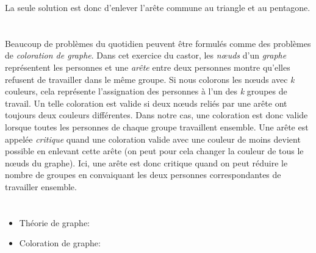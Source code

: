 {{La seule solution est donc d’enlever l’arête commune au triangle et au pentagone.



\section*{\BrochureItsInformatics}
Beaucoup de problèmes du quotidien peuvent être formulés comme des problèmes de \emph{coloration de graphe}.
Dans cet exercice du castor, les \emph{nœuds} d’un \emph{graphe} représentent les personnes et une \emph{arête} entre deux personnes montre qu’elles refusent de travailler dans le même groupe. Si nous colorons les nœuds avec \emph{k} couleurs, cela représente l’assignation des personnes à l’un des \emph{k} groupes de travail. Un telle coloration est valide si deux nœuds reliés par une arête ont toujours deux couleurs différentes. Dans notre cas, une coloration est donc valide lorsque toutes les personnes de chaque groupe travaillent ensemble. Une arête est appelée \emph{critique} quand une coloration valide avec une couleur de moins devient possible en enlevant cette arête (on peut pour cela changer la couleur de tous le nœuds du graphe). Ici, une arête est donc critique quand on peut réduire le nombre de groupes en convaiquant les deux personnes correspondantes de travailler ensemble.



\section*{\BrochureWebsitesAndKeywords}
{\raggedright
\begin{itemize}
  \item Théorie de graphe: \href{https://fr.wikipedia.org/wiki/Th\%C3\%A9orie_des_graphes}{}
  \item Coloration de graphe: \href{https://fr.wikipedia.org/wiki/Coloration_de_graphe}{}
\end{itemize}


}

}{}

\def\AuthorFreiF{} %
\def\AuthorKimD{} %
\def\AuthorPiperH{} %
\def\AuthorKandlhoferM{} %
\def\AuthorDatzkoS{} %
\def\AuthorPelletE{} %

\newpage}{}
